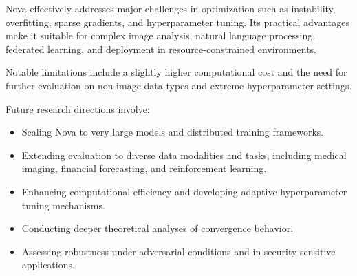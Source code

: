 \documentclass[10pt,twocolumn]{article}
\begin{document}
Nova effectively addresses major challenges in optimization such as instability, overfitting, sparse gradients, and hyperparameter tuning. Its practical advantages make it suitable for complex image analysis, natural language processing, federated learning, and deployment in resource-constrained environments.

Notable limitations include a slightly higher computational cost and the need for further evaluation on non-image data types and extreme hyperparameter settings.

Future research directions involve:
\begin{itemize}
    \item Scaling Nova to very large models and distributed training frameworks.
    \item Extending evaluation to diverse data modalities and tasks, including medical imaging, financial forecasting, and reinforcement learning.
    \item Enhancing computational efficiency and developing adaptive hyperparameter tuning mechanisms.
    \item Conducting deeper theoretical analyses of convergence behavior.
    \item Assessing robustness under adversarial conditions and in security-sensitive applications.
\end{itemize}
\end{document}
